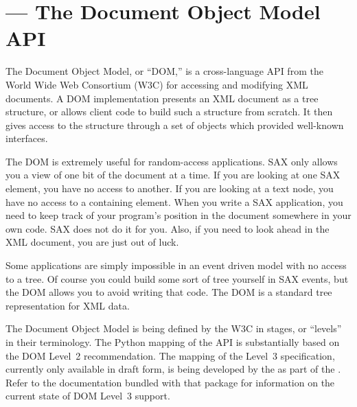 \section{ ---
         The Document Object Model API}



The Document Object Model, or ``DOM,'' is a cross-language API from
the World Wide Web Consortium (W3C) for accessing and modifying XML
documents.  A DOM implementation presents an XML document as a tree
structure, or allows client code to build such a structure from
scratch.  It then gives access to the structure through a set of
objects which provided well-known interfaces.

The DOM is extremely useful for random-access applications.  SAX only
allows you a view of one bit of the document at a time.  If you are
looking at one SAX element, you have no access to another.  If you are
looking at a text node, you have no access to a containing element.
When you write a SAX application, you need to keep track of your
program's position in the document somewhere in your own code.  SAX
does not do it for you.  Also, if you need to look ahead in the XML
document, you are just out of luck.

Some applications are simply impossible in an event driven model with
no access to a tree.  Of course you could build some sort of tree
yourself in SAX events, but the DOM allows you to avoid writing that
code.  The DOM is a standard tree representation for XML data.


The Document Object Model is being defined by the W3C in stages, or
``levels'' in their terminology.  The Python mapping of the API is
substantially based on the DOM Level~2 recommendation.  The mapping of
the Level~3 specification, currently only available in draft form, is
being developed by the  as part of the
.  Refer to the
documentation bundled with that package for information on the current
state of DOM Level~3 support.

